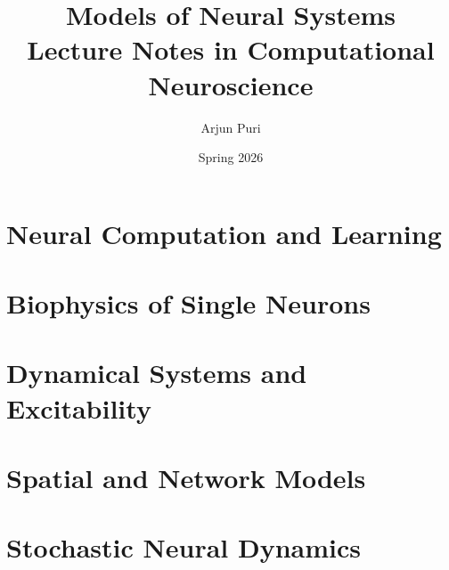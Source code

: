 \documentclass{mns}
\title{Models of Neural Systems\\[0.5em]
  \large Lecture Notes in Computational Neuroscience}
\author{Arjun Puri}
\date{Spring 2026}
\begin{document}
\frontmatter

\tableofcontents



\mainmatter

\part{Neural Computation and Learning}




\part{Biophysics of Single Neurons}





\part{Dynamical Systems and Excitability}




\part{Spatial and Network Models}





\part{Stochastic Neural Dynamics}


\backmatter

\printbibliography[heading=bibintoc]
\printindex
\end{document}
